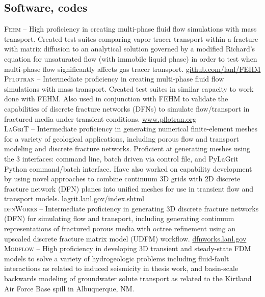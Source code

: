 \documentclass[11pt, letterpaper]{article}
\begin{document}
\subsection*{Software, codes}
\noindent
\textsc{Fehm} – High proficiency in creating multi-phase fluid flow simulations
with mass transport. Created test suites comparing vapor tracer transport
within a fracture with matrix diffusion to an analytical solution governed by a
modified Richard's equation for unsaturated flow (with immobile liquid phase)
in order to test when multi-phase flow significantly affects gas tracer
transport. \href{https://github.com/lanl/FEHM}{github.com/lanl/FEHM} \\[5pt]
\textsc{Pflotran} – Intermediate proficiency in creating multi-phase fluid flow
simulations with mass transport. Created test suites in similar capacity to
work done with FEHM. Also used in conjunction with FEHM to validate the
capabilities of discrete fracture networks (DFNs) to simulate flow/transport in
fractured media under transient conditions.
\href{https://www.pflotran.org}{www.pflotran.org} \\[5pt]
\textsc{LaGriT} – Intermediate proficiency in generating numerical
finite-element meshes for a variety of geological applications, including
porous flow and transport modeling and discrete fracture networks. Proficient
at generating meshes using the 3 interfaces: command line, batch driven via
control file, and PyLaGrit Python command/batch interface. Have also worked on
capability development by using novel approaches to combine continuum 3D grids
with 2D discrete fracture network (DFN) planes into unified meshes for use in
transient flow and transport models.
\href{https://lagrit.lanl.gov/index.shtml}{lagrit.lanl.gov/index.shtml} \\[5pt]
\textsc{dfnWorks} – Intermediate proficiency in generating 3D discrete fracture
networks (DFN) for simulating flow and transport, including generating
continuum representations of fractured porous media with octree refinement
using an upscaled discrete fracture matrix model (UDFM) workflow.
\href{https://dfnworks.lanl.gov}{dfnworks.lanl.gov} \\[5pt] 
\textsc{Modflow} – High proficiency in developing 3D transient and steady-state
FDM models to solve a variety of hydrogeologic problems including fluid-fault
interactions as related to induced seismicity in thesis work, and basin-scale
backwards modeling of groundwater solute transport as related to the Kirtland
Air Force Base spill in Albuquerque, NM.\\[5pt]
\end{document}
